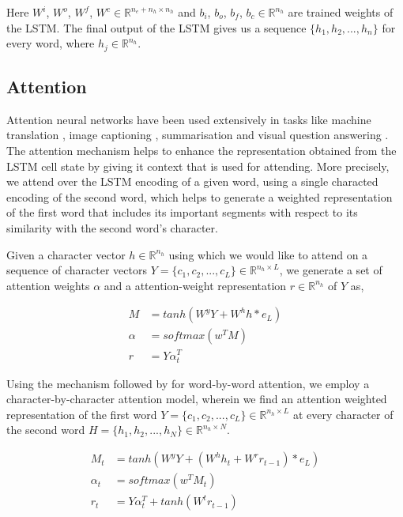 \documentclass[11pt,letterpaper]{article}
\begin{document}
Here $W^i$, $W^o$, $W^f$, $W^c \in  \mathbb{R}^{n_e+n_h \times n_h}$ and $b_i$, $b_o$, $b_f$, $b_c \in \mathbb{R}^{n_h}$ are trained weights of the LSTM. The final output of the LSTM gives us a sequence $\{h_1, h_2, ..., h_n\}$ for every word, where $h_j \in \mathbb{R}^{n_h}$.

\subsection{Attention}

Attention neural networks have been used extensively in tasks like machine translation \cite{}, image captioning \cite{}, summarisation \cite{} and visual question answering \cite{}. The attention mechanism helps to enhance the representation obtained from the LSTM cell state by giving it context that is used for attending. More precisely, we attend over the LSTM encoding of a given word, using a single characted encoding of the second word, which helps to generate a weighted representation of the first word that includes its important segments with respect to its similarity with the second word's character. 

Given a character vector $h \in  \mathbb{R}^{n_h}$ using which we would like to attend on a sequence of character vectors $Y = \{c_1, c_2, ..., c_L\} \in \mathbb{R}^{n_h \times L}$, we generate a set of attention weights $\alpha$ and a attention-weight representation $r \in  \mathbb{R}^{n_h}$ of $Y$ as,

\begin{align}
M &= tanh(W^yY + W^hh*e_L) \\
\alpha &= softmax(w^TM) \\
r &= Y\alpha_t^T
\end{align}

Using the mechanism followed by \citet{rocktaschel2016reasoning} for word-by-word attention, we employ a character-by-character attention model, wherein we find an attention weighted representation of the first word $Y = \{c_1, c_2, ..., c_L\} \in \mathbb{R}^{n_h \times L}$ at every character of the second word $H = \{h_1, h_2, ..., h_N\} \in \mathbb{R}^{n_h \times N}$.

\begin{align}
M_t &= tanh(W^yY + (W^hh_t + W^rr_{t-1})*e_L) \\
\alpha_t &= softmax(w^TM_t) \\
r_t &= Y\alpha_t^T + tanh(W^tr_{t-1})
\end{align}
\end{document}
